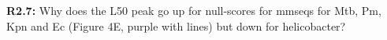 \documentclass[aps,rmp,onecolumn]{revtex4-1}
\newcommand{\Marco}[1]{{\color{orange}Marco: #1}}
\newcommand{\Liam}[1]{{\color{teal}Liam: #1}}
\newcommand{\reviewer}[2]{\textbf{#1:} #2\vskip 5mm}
\begin{document}
\reviewer{R2.7}{Why does the L50 peak go up for null-scores for mmseqs for Mtb, Pm, Kpn and Ec (Figure 4E, purple with lines) but down for helicobacter?}
\end{document}
